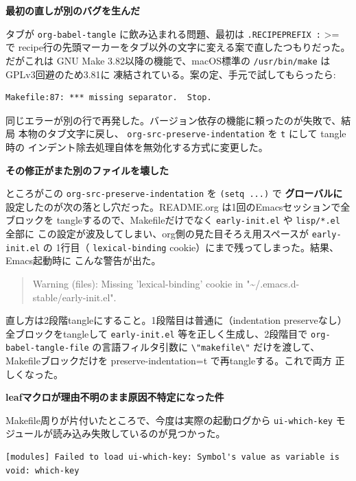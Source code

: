 \documentclass[11pt]{article}
\begin{document}
\textbf{最初の直しが別のバグを生んだ}

タブが \texttt{org-babel-tangle} に飲み込まれる問題、最初は \texttt{.RECIPEPREFIX :} >= で
recipe行の先頭マーカーをタブ以外の文字に変える案で直したつもりだった。だがこれは
GNU Make 3.82以降の機能で、macOS標準の \texttt{/usr/bin/make} はGPLv3回避のため3.81に
凍結されている。案の定、手元で試してもらったら:

\begin{verbatim}
Makefile:87: *** missing separator.  Stop.
\end{verbatim}

同じエラーが別の行で再発した。バージョン依存の機能に頼ったのが失敗で、結局
本物のタブ文字に戻し、 \texttt{org-src-preserve-indentation} を \texttt{t} にして tangle時の
インデント除去処理自体を無効化する方式に変更した。

\textbf{その修正がまた別のファイルを壊した}

ところがこの \texttt{org-src-preserve-indentation} を \texttt{(setq ...)} で \textbf{グローバルに}
設定したのが次の落とし穴だった。README.org は1回のEmacsセッションで全ブロックを
tangleするので、Makefileだけでなく \texttt{early-init.el} や \texttt{lisp/*.el} 全部に
この設定が波及してしまい、org側の見た目そろえ用スペースが \texttt{early-init.el} の
1行目（ \texttt{lexical-binding} cookie）にまで残ってしまった。結果、Emacs起動時に
こんな警告が出た。

\begin{quote}
Warning (files): Missing 'lexical-binding' cookie in "\textasciitilde{}/.emacs.d-stable/early-init.el".
\end{quote}

直し方は2段階tangleにすること。1段階目は普通に（indentation preserveなし）
全ブロックをtangleして \texttt{early-init.el} 等を正しく生成し、2段階目で
\texttt{org-babel-tangle-file} の言語フィルタ引数に \texttt{\textbackslash{}"makefile\textbackslash{}"} だけを渡して、
Makefileブロックだけを preserve-indentation=t で再tangleする。これで両方
正しくなった。

\textbf{leafマクロが理由不明のまま原因不特定になった件}

Makefile周りが片付いたところで、今度は実際の起動ログから \texttt{ui-which-key}
モジュールが読み込み失敗しているのが見つかった。

\begin{verbatim}
[modules] Failed to load ui-which-key: Symbol's value as variable is void: which-key
\end{verbatim}
\end{document}
